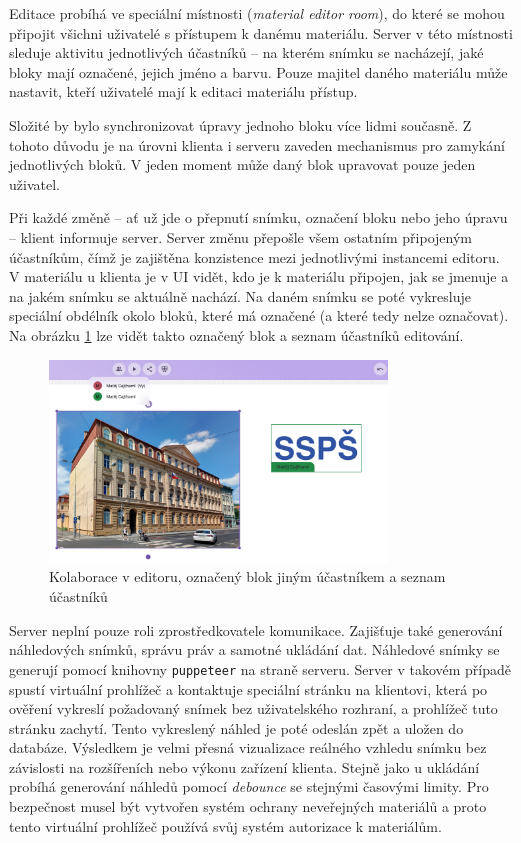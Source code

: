 Editace probíhá ve speciální místnosti (\textit{material editor room}), do které se mohou připojit všichni uživatelé s přístupem k danému materiálu. 
Server v této místnosti sleduje aktivitu jednotlivých účastníků -- na kterém snímku se nacházejí, jaké bloky mají označené, jejich jméno a barvu. 
Pouze majitel daného materiálu může nastavit, kteří uživatelé mají k editaci materiálu přístup.

Složité by bylo synchronizovat úpravy jednoho bloku více lidmi současně.
Z tohoto důvodu je na úrovni klienta i serveru zaveden mechanismus pro zamykání jednotlivých bloků.
V jeden moment může daný blok upravovat pouze jeden uživatel.

Při každé změně -- ať už jde o přepnutí snímku, označení bloku nebo jeho úpravu -- klient informuje server. 
Server změnu přepošle všem ostatním připojeným účastníkům, čímž je zajištěna konzistence mezi jednotlivými instancemi editoru.
V materiálu u klienta je v UI vidět, kdo je k materiálu připojen, jak se jmenuje a na jakém snímku se aktuálně nachází.
Na daném snímku se poté vykresluje speciální obdélník okolo bloků, které má označené (a které tedy nelze označovat).
Na obrázku \ref{fig:realizace/kolaborace} lze vidět takto označený blok a seznam účastníků editování.



\begin{figure}[ht!]
    \centering
    \includegraphics[width=0.8\textwidth]{media/05_realizace/kolaborace.png}
    \caption{Kolaborace v editoru, označený blok jiným účastníkem a seznam účastníků}
    \label{fig:realizace/kolaborace}
\end{figure}


Server neplní pouze roli zprostředkovatele komunikace. 
Zajišťuje také generování náhledových snímků, správu práv a samotné ukládání dat.
Náhledové snímky se generují pomocí knihovny \texttt{puppeteer} na straně serveru. 
Server v takovém případě spustí virtuální prohlížeč a kontaktuje speciální stránku na klientovi, která po ověření vykreslí požadovaný snímek bez uživatelského rozhraní, a prohlížeč tuto stránku zachytí. 
Tento vykreslený náhled je poté odeslán zpět a uložen do databáze. 
Výsledkem je velmi přesná vizualizace reálného vzhledu snímku bez závislosti na rozšířeních nebo výkonu zařízení klienta.
Stejně jako u ukládání probíhá generování náhledů pomocí \textit{debounce} se stejnými časovými limity.
Pro bezpečnost musel být vytvořen systém ochrany neveřejných materiálů a proto tento virtuální prohlížeč používá svůj systém autorizace k materiálům.

